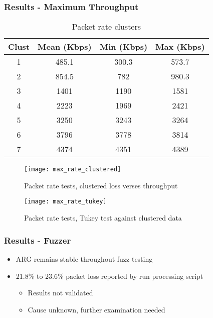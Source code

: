 \documentclass{beamer}
\begin{document}
\begin{frame}
	\frametitle{Results - Maximum Throughput}

	\begin{overprint}
		\footnotesize{
		\begin{table}
		\caption{Packet rate clusters}
		\label{tbl:pr_clusters}
		\centering
		\begin{tabular}{cccc}
		\toprule
		\textbf{Clust} & \textbf{Mean (Kbps)}  & \textbf{Min (Kbps)}  & \textbf{Max (Kbps)} \\
		\hline
		1 & 485.1 & 300.3 & 573.7\\
		2 & 854.5 & 782 & 980.3\\
		3 & 1401 & 1190 & 1581\\
		4 & 2223 & 1969 & 2421\\
		5 & 3250 & 3243 & 3264\\
		6 & 3796 & 3778 & 3814\\
		7 & 4374 & 4351 & 4389\\
		\bottomrule
		\end{tabular}
		\end{table}
		}

		\begin{figure}
		\caption{Packet rate tests, clustered loss verses throughput}
		\vspace{-20pt}
		\texttt{[image: max\_rate\_clustered]}
		\end{figure}

		\begin{figure}
		\caption{Packet rate tests, Tukey test against clustered data}
		\vspace{-10pt}
		\texttt{[image: max\_rate\_tukey]}
		\end{figure}
	\end{overprint}
\end{frame}

\begin{frame}
	\frametitle{Results - Fuzzer}

	\begin{itemize}
	\item ARG remains stable throughout fuzz testing
	\item 21.8\% to 23.6\% packet loss reported by run processing script
		\begin{itemize}
		\item Results not validated
		\item Cause unknown, further examination needed
		\end{itemize}
	\end{itemize}
\end{frame}
\end{document}
